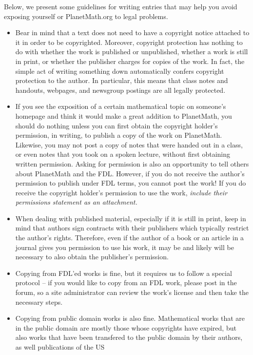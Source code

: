 Below, we present some guidelines for writing entries that may help
you avoid exposing yourself or PlanetMath.org to legal problems.

\begin{itemize}
\item Bear in mind that a text does not need to have a copyright
notice attached to it in order to be copyrighted. Moreover,
copyright protection has nothing to do with whether the work is
published or unpublished, whether a work is still in print, or
whether the publisher charges for copies of the work. In fact, the
simple act of writing something down automatically confers copyright
protection to the author. In particular, this means that class
notes and handouts, webpages, and newsgroup postings are all legally
protected.
\item If you see the exposition of a certain mathematical topic on
someone's homepage and think it would make a great addition to
PlanetMath, you should do nothing unless you can first obtain the
copyright holder's permission, in writing, to publish a copy of the
work on PlanetMath. Likewise, you may not post a copy of notes that
were handed out in a class, or even notes that you took on a spoken
lecture, without first obtaining written permission. Asking for
permission is also an opportunity to tell others about PlanetMath
and the FDL. However, if you do not receive the author's permission
to publish under FDL terms, you cannot post the work! If you do
receive the copyright holder's permission to use the work,
\emph{include their permissions statement as an attachment.}
\item When dealing with published material, especially if it is still in
print, keep in mind that authors sign contracts with their publishers
which typically restrict the author's rights. Therefore, even if the
author of a book or an article in a journal gives you permission to
use his work, it may be and likely will be necessary to also obtain the
publisher's permission.
\item Copying from FDL'ed works is fine, but it requires us to follow
a special protocol -- if you would like to copy from an FDL work,
please post in the forum, so a site administrator can review the
work's license and then take the necessary steps.
\item Copying from public domain works is also fine. Mathematical
works that are in the public domain are mostly those whose
copyrights have expired, but also works that have been transfered to
the public domain by their authors, as well publications of the US

\end{itemize}
